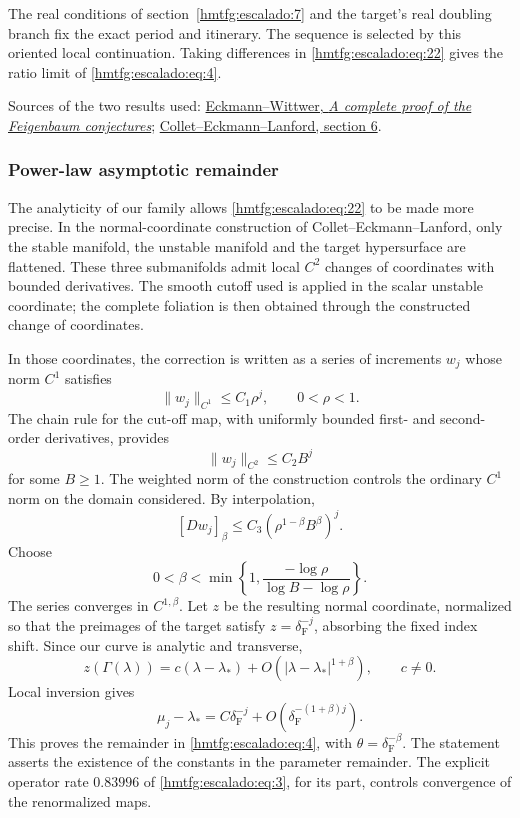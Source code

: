 The real conditions of section~\ref{hmtfg:escalado:7} and the target’s real doubling branch fix the exact period and itinerary. The sequence is selected by this oriented local continuation. Taking differences in \eqref{hmtfg:escalado:eq:22} gives the ratio limit of \eqref{hmtfg:escalado:eq:4}.

Sources of the two results used: \href{https://link.springer.com/article/10.1007/BF01013368}{Eckmann–Wittwer, \emph{A complete proof of the Feigenbaum conjectures}}; \href{https://people.math.harvard.edu/~knill/history/lanford/papers/ColletEckmannLanford.pdf}{Collet–Eckmann–Lanford, section 6}.

\subsubsection{Power-law asymptotic remainder}

The analyticity of our family allows \eqref{hmtfg:escalado:eq:22} to be made more precise. In the normal-coordinate construction of Collet–Eckmann–Lanford, only the stable manifold, the unstable manifold and the target hypersurface are flattened. These three submanifolds admit local \(C^2\) changes of coordinates with bounded derivatives. The smooth cutoff used is applied in the scalar unstable coordinate; the complete foliation is then obtained through the constructed change of coordinates.

In those coordinates, the correction is written as a series of increments \(w_j\) whose norm \(C^1\) satisfies
\[
\|w_j\|_{C^1}\le C_1\rho^j,\qquad 0<\rho<1.
\]
The chain rule for the cut-off map, with uniformly bounded first- and second-order derivatives, provides
\[
\|w_j\|_{C^2}\le C_2B^j
\]
for some \(B\ge1\). The weighted norm of the construction controls the ordinary \(C^1\) norm on the domain considered. By interpolation,
\[
[Dw_j]_\beta\le C_3
\left(\rho^{1-\beta}B^\beta\right)^j.
\]
Choose
\begin{equation}
0<\beta<\min\left\{1,
\frac{-\log\rho}{\log B-\log\rho}\right\}.
\label{hmtfg:escalado:eq:23}
\end{equation}
The series converges in \(C^{1,\beta}\). Let \(z\) be the resulting normal coordinate, normalized so that the preimages of the target satisfy \(z=\delta_{\mathrm F}^{-j}\), absorbing the fixed index shift. Since our curve is analytic and transverse,
\[
z(\Gamma(\lambda))=c(\lambda-\lambda_*)
+O(|\lambda-\lambda_*|^{1+\beta}),\qquad c\ne0.
\]
Local inversion gives
\begin{equation}
\mu_j-\lambda_*=C\delta_{\mathrm F}^{-j}
+O\left(\delta_{\mathrm F}^{-(1+\beta)j}\right).
\label{hmtfg:escalado:eq:24}
\end{equation}
This proves the remainder in \eqref{hmtfg:escalado:eq:4}, with \(\theta=\delta_{\mathrm F}^{-\beta}\). The statement asserts the existence of the constants in the parameter remainder. The explicit operator rate \(0.83996\) of \eqref{hmtfg:escalado:eq:3}, for its part, controls convergence of the renormalized maps.


